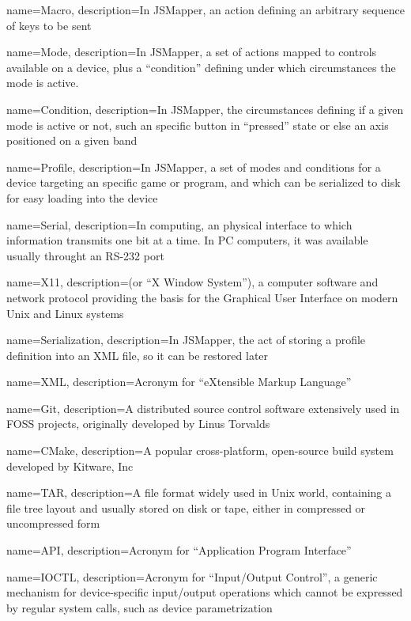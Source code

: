 {
  name=Macro,
  description={In JSMapper, an action defining an arbitrary sequence of keys to be sent}
}

{
  name=Mode,
  description={In JSMapper, a set of actions mapped to controls available on a device, plus a ``condition'' defining under which circumstances the mode is active.}
}

{
  name=Condition,
  description={In JSMapper, the circumstances defining if a given mode is active or not, such an specific button in ``pressed'' state or else an axis positioned on a given band}
}

{
  name=Profile,
  description={In JSMapper, a set of modes and conditions for a device targeting an specific game or program, and which can be serialized to disk for easy loading into the device}
}

{
  name=Serial,
  description={In computing, an physical interface to which information transmits one bit at a time. In PC computers, it was available usually throught an RS-232 port}
}

{
  name=X11,
  description={(or ``X Window System''), a computer software and network protocol providing the basis for the Graphical User Interface on modern Unix and Linux systems}
}

{
  name=Serialization,
  description={In JSMapper, the act of storing a profile definition into an XML file, so it can be restored later}
}

{
  name=XML,
  description={Acronym for ``eXtensible Markup Language''}
}

{
  name=Git,
  description={A distributed source control software extensively used in FOSS projects, originally developed by Linus Torvalds}
}

{
  name=CMake,
  description={A popular cross-platform, open-source build system developed by Kitware, Inc}
}

{
  name=TAR,
  description={A file format widely used in Unix world, containing a file tree layout and usually stored on disk or tape, either in compressed or uncompressed form}
}

{
  name=API,
  description={Acronym for ``Application Program Interface''}
}

{
  name=IOCTL,
  description={Acronym for ``Input/Output Control'', a generic mechanism for device-specific input/output operations which cannot be expressed by regular system calls, such as device parametrization}
}


